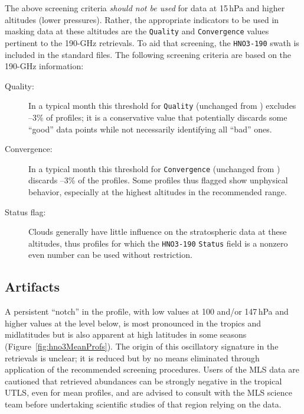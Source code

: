 \begin{nofloatpages}
The above screening criteria \emph{should not be used} for data at 15\,hPa and higher altitudes (lower pressures). Rather, the appropriate indicators to be used in masking  data at these altitudes are the \texttt{Quality} and \texttt{Convergence} values pertinent to the \mbox{190-GHz} retrievals. To aid that screening, the \texttt{HNO3-190} swath is included in the standard  files. The following screening criteria are based on the \mbox{190-GHz}  information:

\begin{description}

  \item[Quality:]  In a typical month this threshold for \texttt{Quality} (unchanged from \prevv) excludes --3\% of  profiles; it is a conservative value that potentially discards some ``good'' data points while not necessarily identifying all ``bad'' ones.

  \item[Convergence:]  In a typical month this threshold for \texttt{Convergence} (unchanged from \prevv) discards --3\% of the  profiles. Some profiles thus flagged show unphysical behavior, especially at the highest altitudes in the recommended range.

  \item[Status flag:]  Clouds generally have little influence on the stratospheric  data at these altitudes, thus profiles for which the \texttt{HNO3-190} \texttt{Status} field is a nonzero even number can be used without restriction.

\end{description}
\end{nofloatpages}

\subsection{Artifacts}

A persistent ``notch'' in the profile, with low values at 100 and/or 147\,hPa and higher values at the level below, is most pronounced in the tropics and midlatitudes but is also apparent at high latitudes in some seasons (Figure~\ref{fig:hno3MeanProfs}). The origin of this oscillatory signature in the retrievals is unclear; it is reduced but by no means eliminated through application of the recommended screening procedures. Users of the MLS  data are cautioned that retrieved abundances can be strongly negative in the tropical UTLS, even for mean profiles, and are advised to consult with the MLS science team before undertaking scientific studies of that region relying on the \thisv {} data.

